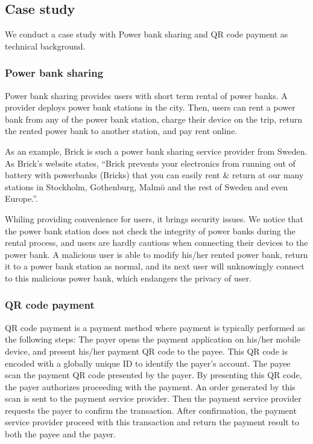\subsection{Case study}

We conduct a case study with Power bank sharing and QR code payment as technical background.

\subsubsection{Power bank sharing}

Power bank sharing provides users with short term rental of power banks. A provider deploys power bank stations in the city. Then, users can rent a power bank from any of the power bank station, charge their device on the trip, return the rented power bank to another station, and pay rent online.

As an example, Brick is such a power bank sharing service provider from Sweden. As Brick's website states, ``Brick prevents your electronics from running out of battery with powerbanks (Bricks) that you can easily rent \& return at our many stations in Stockholm, Gothenburg, Malmö and the rest of Sweden and even Europe.''. 



Whiling providing convenience for users, it brings security issues. We notice that the power bank station does not check the integrity of power banks during the rental process, and users are hardly cautious when connecting their devices to the power bank. A malicious user is able to modify his/her rented power bank, return it to a power bank station as normal, and its next user will unknowingly connect to this malicious power bank, which endangers the privacy of user.

\subsubsection{QR code payment}

QR code payment is a payment method where payment is typically performed as the following steps:
 The payer opens the payment application on his/her mobile device, and present his/her payment QR code to the payee. This QR code is encoded with a globally unique ID to identify the payer's account. 
 The payee scan the payment QR code presented by the payer. By presenting this QR code, the payer authorizes proceeding with the payment.
 An order generated by this scan is sent to the payment service provider. Then the payment service provider requests the payer to confirm the transaction.
 After confirmation, the payment service provider proceed with this transaction and return the payment result to both the payee and the payer.

